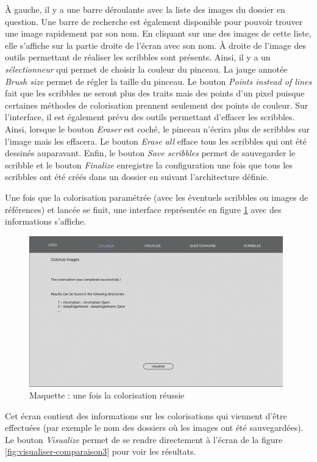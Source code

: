 \documentclass{article}
\begin{document}
À gauche, il y a une barre déroulante avec la liste des images du dossier en question. Une barre de recherche est également disponible pour
pouvoir trouver une image rapidement par son nom.
En cliquant sur une des images de cette liste, elle s'affiche sur la partie droite de l'écran avec son nom.
À droite de l'image des outils permettant de réaliser les scribbles sont présents. Ainsi, il y a un \textit{sélectionneur} qui permet de choisir la
couleur du pinceau. La jauge annotée \textit{Brush size} permet de régler la taille du pinceau.
Le bouton \textit{Points instead of lines} fait que les scribbles ne seront plus des traits mais des points d'un pixel puisque certaines 
méthodes de colorisation prennent seulement des points de couleur. Sur l'interface, il est également prévu des outils permettant d'effacer les scribbles. Ainsi,
lorsque le bouton \textit{Eraser} est coché, le pinceau n'écrira plus de scribbles sur l'image mais les effacera. Le bouton \textit{Erase all} efface tous les scribbles qui ont été 
dessinés auparavant.
Enfin, le bouton \textit{Save scribbles} permet de sauvegarder le scribble et le bouton \textit{Finalize} enregistre la configuration une fois que tous les scribbles ont été 
créés dans un dossier en suivant l'architecture définie.

Une fois que la colorisation paramétrée (avec les éventuels scribbles ou images de références) et lancée se finit, une interface représentée en figure \ref{fig:coloriser-succes} avec 
des informations s'affiche.

\begin{figure}[!ht]
    \centering
    \includegraphics[width=11cm]{coloriser-succes.png}
    \caption{Maquette : une fois la colorisation réussie}
    \label{fig:coloriser-succes}
\end{figure}

Cet écran contient des informations sur les colorisations qui viennent d'être effectuées (par exemple le nom des dossiers où les images ont été sauvegardées).
Le bouton \textit{Visualize} permet de se rendre directement à l'écran de la figure \ref{fig:visualiser-comparaison3} pour voir les résultats.
\end{document}

